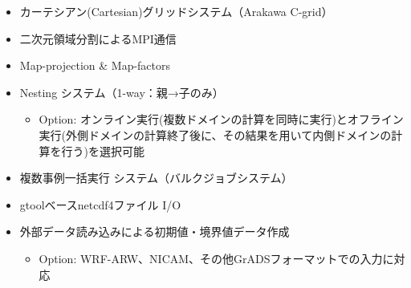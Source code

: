 \begin{itemize}
 \item カーテシアン(Cartesian)グリッドシステム（Arakawa C-grid）
 \item 二次元領域分割によるMPI通信
 \item Map-projection \& Map-factors
 \item Nesting システム（1-way：親→子のみ）
   \begin{itemize}
    \item Option: オンライン実行(複数ドメインの計算を同時に実行)とオフライン実行(外側ドメインの計算終了後に、その結果を用いて内側ドメインの計算を行う)を選択可能
   \end{itemize}
 \item 複数事例一括実行 システム（バルクジョブシステム）
 \item gtoolベースnetcdf4ファイル I/O
 \item 外部データ読み込みによる初期値・境界値データ作成
   \begin{itemize}
    \item Option: WRF-ARW、NICAM、その他GrADSフォーマットでの入力に対応
   \end{itemize}
\end{itemize}

